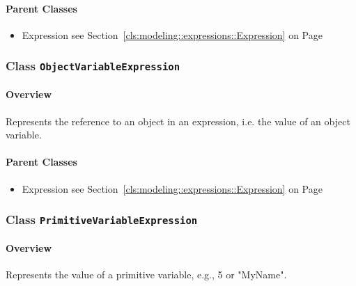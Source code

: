 	



\paragraph{Parent Classes}
\begin{itemize}
\item Expression see Section~\ref{cls:modeling::expressions::Expression} on Page~\pageref{cls:modeling::expressions::Expression}\end{itemize}
\subsubsection{\Large{Class \bfseries \texttt{ObjectVariableExpression}\normalfont}}
\label{cls:modeling::patterns::expressions::ObjectVariableExpression} 
\paragraph{Overview}

	
			
Represents the reference to an object in an expression, i.e. the value of an object variable.	
		
	



\paragraph{Parent Classes}
\begin{itemize}
\item Expression see Section~\ref{cls:modeling::expressions::Expression} on Page~\pageref{cls:modeling::expressions::Expression}\end{itemize}
\subsubsection{\Large{Class \bfseries \texttt{PrimitiveVariableExpression}\normalfont}}
\label{cls:modeling::patterns::expressions::PrimitiveVariableExpression} 
\paragraph{Overview}

	
			
Represents the value of a primitive variable, e.g., 5 or "MyName".	
		
	



